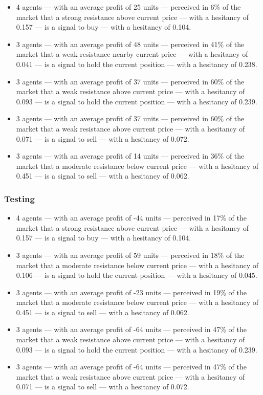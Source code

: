 {\small
  \begin{itemize}
  \item 4 agents — with an average profit of 25 units — perceived in 6\% of the
    market that a strong resistance above current price — with a hesitancy of
    0.157 — is a signal to buy — with a hesitancy of 0.104.
  \item 3 agents — with an average profit of 48 units — perceived in 41\% of the
    market that a weak resistance nearby current price — with a hesitancy of
    0.041 — is a signal to hold the current position — with a hesitancy of
    0.238.
  \item 3 agents — with an average profit of 37 units — perceived in 60\% of the
    market that a weak resistance above current price — with a hesitancy of
    0.093 — is a signal to hold the current position — with a hesitancy of
    0.239.
  \item 3 agents — with an average profit of 37 units — perceived in 60\% of the
    market that a weak resistance above current price — with a hesitancy of
    0.071 — is a signal to sell — with a hesitancy of 0.072.
  \item 3 agents — with an average profit of 14 units — perceived in 36\% of the
    market that a moderate resistance below current price — with a hesitancy of
    0.451 — is a signal to sell — with a hesitancy of 0.062.
  \end{itemize}
}

\subsubsection{Testing}
\label{}

{\small
  \begin{itemize}
  \item 4 agents — with an average profit of -44 units — perceived in 17\% of
    the market that a strong resistance above current price — with a hesitancy
    of 0.157 — is a signal to buy — with a hesitancy of 0.104.
  \item 3 agents — with an average profit of 59 units — perceived in 18\% of the
    market that a moderate resistance below current price — with a hesitancy of
    0.106 — is a signal to hold the current position — with a hesitancy of
    0.045.
  \item 3 agents — with an average profit of -23 units — perceived in 19\% of
    the market that a moderate resistance below current price — with a hesitancy
    of 0.451 — is a signal to sell — with a hesitancy of 0.062.
  \item 3 agents — with an average profit of -64 units — perceived in 47\% of
    the market that a weak resistance above current price — with a hesitancy of
    0.093 — is a signal to hold the current position — with a hesitancy of
    0.239.
  \item 3 agents — with an average profit of -64 units — perceived in 47\% of
    the market that a weak resistance above current price — with a hesitancy of
    0.071 — is a signal to sell — with a hesitancy of 0.072.
  \end{itemize}
}

